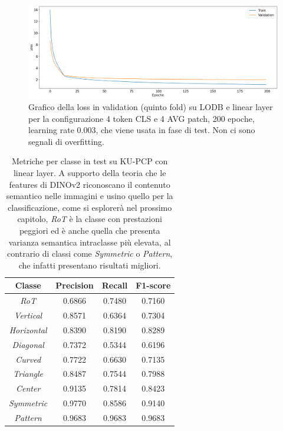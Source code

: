 \begin{figure}[p]
    \centering
    \includegraphics[width=0.8\linewidth]{Immagini/risultati/loss-lodb-linear.png}
    \caption{Grafico della loss in validation (quinto fold) su LODB e linear layer per la configurazione 4 token CLS e 4 AVG patch, 200 epoche, learning rate 0.003, che viene usata in fase di test. Non ci sono segnali di overfitting.}
    \label{fig:loss-lodb-linear}
\end{figure}

\begin{table}[p]
    \centering
    \setlength{\tabcolsep}{5pt} %
    \renewcommand{\arraystretch}{1.6} %
    \begin{tabular}{c|c|c|c}
         Classe & \textbf{Precision} & \textbf{Recall} & \textbf{F1-score} \\
         \hline
         \hline
\textit{RoT}               &         0.6866    &   0.7480    &   0.7160       \\
\textit{Vertical}          &         0.8571    &   0.6364    &   0.7304       \\
\textit{Horizontal}        &         0.8390    &   0.8190    &   0.8289       \\
\textit{Diagonal}          &         0.7372    &   0.5344    &   0.6196       \\
\textit{Curved}            &         0.7722    &   0.6630    &   0.7135       \\
\textit{Triangle}          &         0.8487    &   0.7544    &   0.7988       \\
\textit{Center}            &         0.9135    &   0.7814    &   0.8423       \\
\textit{Symmetric}         &         0.9770    &   0.8586    &   0.9140       \\
\textit{Pattern}           &         0.9683    &   0.9683    &   0.9683       \\
    \end{tabular}
    \caption{Metriche per classe in test su KU-PCP con linear layer. A supporto della teoria che le features di DINOv2 riconoscano il contenuto semantico nelle immagini e usino quello per la classificazione, come si esplorerà nel prossimo capitolo, \textit{RoT} è la classe con prestazioni peggiori ed è anche quella che presenta varianza semantica intraclasse più elevata, al contrario di classi come \textit{Symmetric} o \textit{Pattern}, che infatti presentano risultati migliori.}
    \label{tab:kupcp_metriche_classe}
\end{table}

